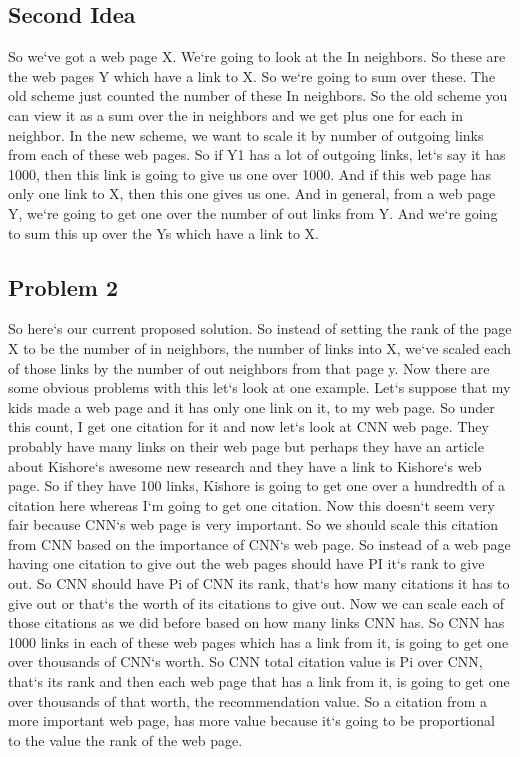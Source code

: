 \subsection{Second Idea}
So we`ve got a web page X\@.
We`re going to look at the In neighbors.
So these are the web pages Y which have a link to X\@.
So we`re going to sum over these.
The old scheme just counted the number of these In neighbors.
So the old scheme you can view it as a sum over the in neighbors and we get plus one for each in neighbor.
In the new scheme, we want to scale it by number of outgoing links from each of these web pages.
So if Y1 has a lot of outgoing links, let`s say it has 1000, then this link is going to give us one over 1000.
And if this web page has only one link to X, then this one gives us one.
And in general, from a web page Y, we`re going to get one over the number of out links from Y\@.
And we`re going to sum this up over the Ys which have a link to X\@.

\subsection{Problem 2}
So here`s our current proposed solution.
So instead of setting the rank of the page X to be the number of in neighbors, the number of links into X, we`ve scaled each of those links by the number of out neighbors from that page y.
Now there are some obvious problems with this let`s look at one example.
Let`s suppose that my kids made a web page and it has only one link on it, to my web page.
So under this count, I get one citation for it and now let`s look at CNN web page.
They probably have many links on their web page but perhaps they have an article about Kishore`s awesome new research and they have a link to Kishore`s web page.
So if they have 100 links, Kishore is going to get one over a hundredth of a citation here whereas I`m going to get one citation.
Now this doesn`t seem very fair because CNN`s web page is very important.
So we should scale this citation from CNN based on the importance of CNN`s web page.
So instead of a web page having one citation to give out the web pages should have PI it`s rank to give out.
So CNN should have Pi of CNN its rank, that`s how many citations it has to give out or that`s the worth of its citations to give out.
Now we can scale each of those citations as we did before based on how many links CNN has.
So CNN has 1000 links in each of these web pages which has a link from it, is going to get one over thousands of CNN`s worth.
So CNN total citation value is Pi over CNN, that`s its rank and then each web page that has a link from it, is going to get one over thousands of that worth, the recommendation value.
So a citation from a more important web page, has more value because it`s going to be proportional to the value the rank of the web page.


